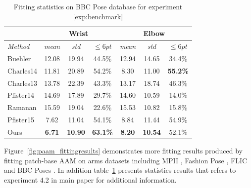 \begin{table}[b!]
    \small
    \centering
    \begin{tabular}{|l|c|c|c||c|c|c|}
        \hline
                            & \multicolumn{3}{c||}{Wrist} & \multicolumn{3}{c|}{Elbow}\\
        \hline
        \emph{Method}       & \emph{mean} & \emph{std} & $\leq 6pt$ & \emph{mean} & \emph{std} & $\leq 6pt$\\
        \hline\hline
        Buehler             & 12.08    & 19.94        & 44.5\%       & 12.94    & 14.65        & 34.4\%\\
        Charles14           & 11.81    & 20.89        & 54.2\%       &  8.30    & 11.00        & \textbf{55.2\%}\\
        Charles13           & 13.78    & 22.39        & 43.3\%       & 13.17    & 18.74        & 46.3\%\\
        Pfister14           & 14.69    & 17.89        & 29.7\%       & 14.60    & 10.59        & 14.0\%\\
        Ramanan             & 15.59    & 19.04        & 22.6\%       & 15.53    & 10.82        & 15.8\%\\
        Pfister15           & 7.62     & 11.04        & 54.1\%       &  8.84    & 11.44        & 54.9\%\\
        \hline\hline
        Ours                & \textbf{6.71}& \textbf{10.90}   & \textbf{63.1\%}       & \textbf{8.20}     &  \textbf{10.54}        & 52.1\%\\
        \hline
    \end{tabular}
    \caption{Fitting statistics on BBC Pose database for experiment \ref{exp:benchmark}}
    \label{tab:hand_benchmark}
\end{table}
    
Figure~\ref{fig:paam_fittingresults} demonstrates more fitting results produced by fitting patch-base AAM on arms datasets including MPII \cite{andriluka14cvpr}, Fashion Pose \cite{dantone2013human}, FLIC \cite{sapp2013modec} and BBC Poses \cite{pfister2015flowing}. In addition table~\ref{tab:hand_benchmark} presents statistics results that refers to experiment 4.2 in main paper for additional information. 













